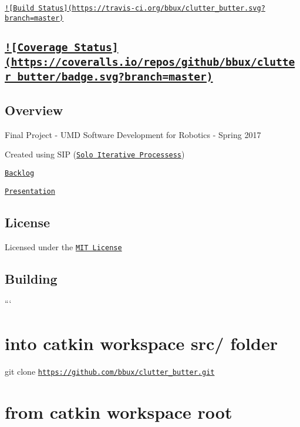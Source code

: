 \href{https://travis-ci.org/bbux/clutter_butter}{\tt !\mbox{[}Build Status\mbox{]}(https\-://travis-\/ci.\-org/bbux/clutter\-\_\-butter.\-svg?branch=master)} \subsection*{\href{https://coveralls.io/github/bbux/clutter_butter?branch=master}{\tt !\mbox{[}Coverage Status\mbox{]}(https\-://coveralls.\-io/repos/github/bbux/clutter\-\_\-butter/badge.\-svg?branch=master)} }

\subsection*{Overview}

Final Project -\/ U\-M\-D Software Development for Robotics -\/ Spring 2017

Created using S\-I\-P (\href{http://www.cs.wayne.edu/rajlich/SlidesSE/18%20example%20of%20sip.pdf}{\tt Solo Iterative Processess})

\href{https://docs.google.com/spreadsheets/d/1wChuRU8l6yA1EAUHQB64F89dBjVsw7t1enh5LzcWQo4/edit#gid=1120123239}{\tt Backlog}

\href{https://docs.google.com/a/terpmail.umd.edu/presentation/d/1-kTNRjpu_Ld7y-KJ0uFyO3MeERlu_CQIDL3VVJ_XrMY/edit?usp=sharing}{\tt Presentation}

\subsection*{License}

Licensed under the \href{https://opensource.org/licenses/MIT}{\tt M\-I\-T License}

\subsection*{Building}

``` \section*{into catkin workspace src/ folder}

git clone \href{https://github.com/bbux/clutter_butter.git}{\tt https\-://github.\-com/bbux/clutter\-\_\-butter.\-git}

\section*{from catkin workspace root}

